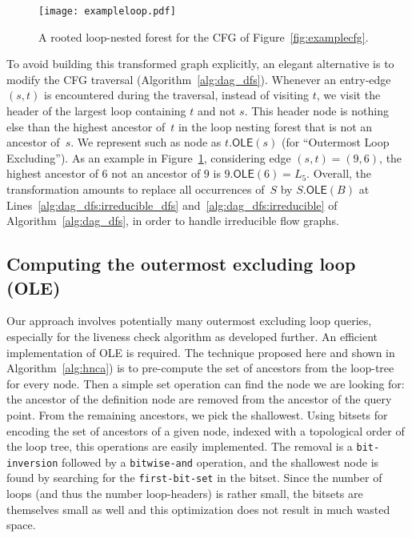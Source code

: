 \begin{figure}[t]
  \begin{center}
    \texttt{[image: exampleloop.pdf]}
  \end{center}
  \caption{A rooted loop-nested forest for the CFG of Figure~\ref{fig:examplecfg}.}
  \label{fig:exampleloop}
\end{figure}

\newcommand{\OLE}[2]{#1.\textsf{OLE}(#2)}

To avoid building this transformed graph explicitly, an elegant alternative is to modify the CFG traversal (Algorithm~\ref{alg:dag_dfs}).
Whenever an entry-edge $(s,t)$ is encountered during the traversal, instead of visiting $t$, we visit the header of the largest loop containing $t$ and not $s$.
This header node is nothing else than the highest ancestor of~$t$ in the loop nesting forest that is not an ancestor of~$s$.
We represent such as node as $\OLE{t}{s}$ (for ``Outermost Loop Excluding'').
As an example in Figure~\ref{fig:exampleloop}, considering edge $(s,t)=(9,6)$, the highest ancestor of $6$ not an ancestor of $9$ is $\OLE{9}{6}=L_5$. 
Overall, the transformation amounts to replace all occurrences of~$S$ by $\OLE{S}{B}$ at Lines~\ref{alg:dag_dfs:irreducible_dfs} and~\ref{alg:dag_dfs:irreducible} of Algorithm~\ref{alg:dag_dfs}, in order to handle irreducible flow graphs.


\newcommand{\couple}[2]{\langle#1,#2\rangle}
\def\sep{,$ $}

\subsection{Computing the outermost excluding loop (OLE)}
\label{sec:ole}
Our approach involves potentially many outermost excluding loop queries, especially for the liveness check algorithm as developed further.
An efficient implementation of \textsf{OLE} is required.
The technique proposed here and shown in Algorithm~\ref{alg:hnca}) is to pre-compute the set of ancestors from the loop-tree for every node.
Then a simple set operation can find the node we are looking for:
the ancestor of the definition node are removed from the ancestor of the query point.
From the remaining ancestors, we pick the shallowest.
Using bitsets for encoding the set of ancestors of a given node, indexed with a topological order of the loop tree, this operations are easily implemented.
The removal is a \texttt{bit-inversion} followed by a \texttt{bitwise-and} operation, and the shallowest node is found by searching for the \texttt{first-bit-set} in the bitset.
Since the number of loops (and thus the number loop-headers) is rather small, the bitsets are themselves small as well and this optimization does not result in much wasted space.


